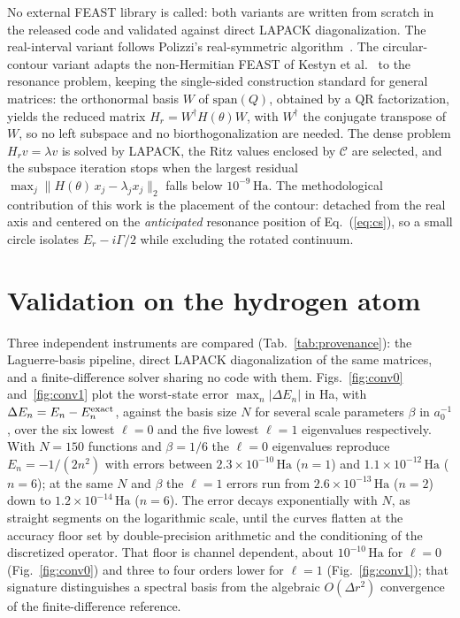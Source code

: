 \documentclass[12pt,twoside]{paper}
\newcommand{\Ha}{\,\mathrm{Ha}}
\begin{document}
No external FEAST library is called: both variants are written from
scratch in the released code and validated against direct LAPACK
diagonalization. The real-interval variant follows Polizzi's
real-symmetric algorithm~\cite{Polizzi2009}. The circular-contour variant
adapts the non-Hermitian FEAST of Kestyn et al.~\cite{Kestyn2016} to the
resonance problem, keeping the single-sided construction standard for
general matrices: the orthonormal basis
$W$ of $\mathrm{span}(Q)$, obtained by a QR factorization, yields the
reduced matrix $H_r = W^{\dagger} H(\theta) W$, with $W^{\dagger}$ the
conjugate transpose of $W$, so no left subspace and no biorthogonalization
are needed. The dense problem $H_r v = \lambda v$ is solved by LAPACK, the
Ritz values enclosed by $\mathcal{C}$ are selected, and the subspace
iteration stops when the largest residual
$\max_j \|H(\theta)\,x_j - \lambda_j x_j\|_2$ falls below $10^{-9}\Ha$.
The methodological contribution of this work is the placement of the
contour: detached from the real axis and centered on the
\emph{anticipated} resonance position of Eq.~(\ref{eq:cs}), so a small
circle isolates $E_r - i\Gamma/2$ while excluding the rotated continuum.

\section{Validation on the hydrogen atom}
\label{sec:validation}

Three independent instruments are compared
(Tab.~\ref{tab:provenance}): the Laguerre-basis pipeline, direct LAPACK
diagonalization of the same matrices, and a finite-difference solver
sharing no code with them. Figs.~\ref{fig:conv0}
and~\ref{fig:conv1} plot the worst-state error
$\max_n|\Delta E_n|$ in Ha, with $\Delta E_n = E_n - E_n^{\rm exact}$,
against the basis size $N$ for several scale parameters $\beta$ in
$a_0^{-1}$, over the six lowest $\ell=0$ and the five lowest $\ell=1$
eigenvalues respectively. With $N=150$ functions and $\beta = 1/6$ the
$\ell=0$ eigenvalues reproduce $E_n = -1/(2n^2)$ with errors between
$2.3\times10^{-10}\Ha$ ($n=1$) and $1.1\times10^{-12}\Ha$ ($n=6$); at the
same $N$ and $\beta$ the $\ell=1$ errors run from $2.6\times10^{-13}\Ha$
($n=2$) down to $1.2\times10^{-14}\Ha$ ($n=6$). The error decays
exponentially with $N$, as straight segments on the logarithmic scale,
until the curves flatten at the accuracy floor set by double-precision
arithmetic and the conditioning of the discretized operator. That floor is
channel dependent, about $10^{-10}\Ha$ for $\ell=0$ (Fig.~\ref{fig:conv0})
and three to four orders lower for $\ell=1$ (Fig.~\ref{fig:conv1}); that
signature distinguishes a spectral basis from the algebraic
$O(\Delta r^2)$ convergence of the finite-difference reference.
\end{document}
